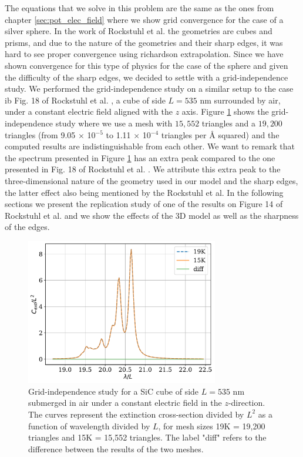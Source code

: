 The equations that we solve in this problem are the same as the ones from chapter \ref{sec:pot_elec_field} where we show grid convergence for the case of 
a silver sphere. In the work of Rockstuhl et al. \cite{rockstuhl2005} the geometries are cubes and prisms, and due to the nature of the geometries 
and their sharp edges, it was hard to see proper convergence using richardson extrapolation. Since we have shown convergence for this type of physics
for the case of the sphere and given the difficulty of the sharp edges, we decided to settle with a grid-independence study. We performed the grid-independence study
on a similar setup to the case ib Fig. 18 of Rockstuhl et al. \cite{rockstuhl2005}, a cube of side $L=535$ nm surrounded by air, under a constant electric field 
aligned with the $z$ axis. Figure \ref{fig:cube535} shows the grid-independence study where we use a mesh with $15,552$ triangles and a $19,200$ triangles 
(from 9.05 $\times$ 10$^{-5}$ to 1.11 $\times$ 10$^{-4}$ triangles per $\text{\AA}$ squared) and the computed results are indistinguishable from each other.
We want to remark that the spectrum presented in Figure \ref{fig:cube535} has an extra peak compared to the one presented in Fig. 18 of Rockstuhl
et al. \cite{rockstuhl2005}. We attribute this extra peak to the three-dimensional nature of the geometry used in our model and the sharp edges, the
latter effect also being mentioned by the Rockstuhl et al. In the following sections we present the replication study of one of the results on 
Figure 14 of Rockstuhl et al. and we show the effects of the 3D model as well as the sharpness of the edges. 

\begin{figure}
    \centering
    \includegraphics[width=0.75\textwidth]{cubeL535nm_15Kvs19K.pdf} 
    \caption{Grid-independence study for a SiC cube of side $L=535$ nm submerged in air under a constant 
    electric field in the $z$-direction. The curves represent the extinction cross-section divided by $L^2$ 
    as a function of wavelength divided by $L$, for mesh sizes 19K = 19,200 triangles and 15K = 15,552 triangles. 
    The label "diff" refers to the difference between the results of the two meshes.}
    \label{fig:cube535}
 \end{figure}

